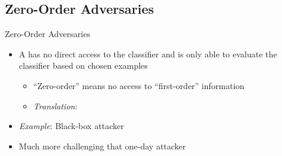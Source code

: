\subsection{Zero-Order Adversaries}
\begin{frame}{Zero-Order Adversaries}
  \begin{itemize}[<+->]
    \setlength{\itemsep}{20pt}
    \item A  has no direct access to the classifier and is only able to evaluate the classifier based on chosen examples
      \begin{itemize}
        \setlength{\itemsep}{8pt}
        \item ``Zero-order'' means no access to ``first-order'' information
        \item \textit{Translation}: 
      \end{itemize}

    \item \textit{Example}: Black-box attacker

    \item Much more challenging that one-day attacker
  \end{itemize}
\end{frame}
